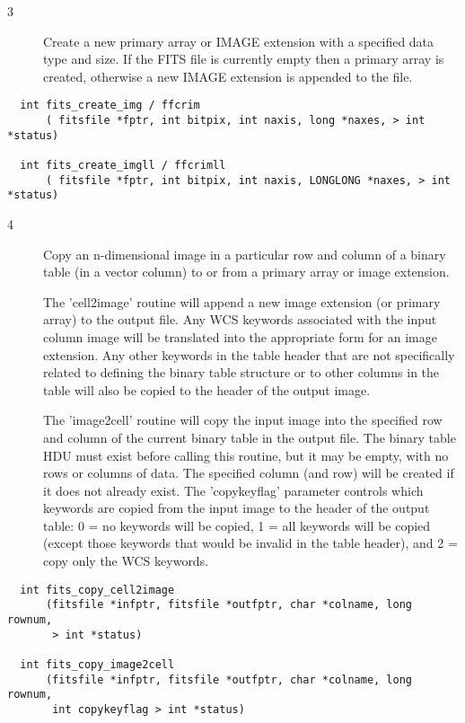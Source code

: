 \documentclass[11pt]{book}
\begin{document}
\begin{description}
\item[3 ]Create a new primary array or IMAGE extension with a specified
   data type and size.  If the FITS file is currently empty then a
   primary array is created, otherwise a new IMAGE extension is
  appended to the file. \label{ffcrim}
\end{description}

\begin{verbatim}
  int fits_create_img / ffcrim
      ( fitsfile *fptr, int bitpix, int naxis, long *naxes, > int *status)

  int fits_create_imgll / ffcrimll
      ( fitsfile *fptr, int bitpix, int naxis, LONGLONG *naxes, > int *status)
\end{verbatim}

\begin{description}
\item[4 ] Copy an n-dimensional image in a particular row and column of a
    binary table (in a vector column)
    to or from a primary array or image extension.

    The 'cell2image' routine
    will append a new image extension (or primary array) to the output file.
    Any WCS keywords associated with the input column image will be translated
    into the appropriate form for an image extension.  Any other keywords
    in the table header that are not specifically related to defining the
    binary table structure or to other columns in the table
    will also be copied to the header of the output image.

    The 'image2cell' routine will copy the input image into the specified row
    and column of the current binary table in the output file.  The binary table
    HDU must exist before calling this routine, but it
    may be empty, with no rows or columns of data.  The specified column
    (and row) will be created if it does not already exist.  The 'copykeyflag'
    parameter controls which keywords are copied from the input
    image to the header of the output table: 0 = no keywords will be copied,
    1 = all keywords will be copied (except those keywords that would be invalid in
   the table header), and 2 = copy only the WCS keywords. \label{copycell}
\end{description}

\begin{verbatim}
  int fits_copy_cell2image
      (fitsfile *infptr, fitsfile *outfptr, char *colname, long rownum,
       > int *status)

  int fits_copy_image2cell
      (fitsfile *infptr, fitsfile *outfptr, char *colname, long rownum,
       int copykeyflag > int *status)
\end{verbatim}
\end{document}
